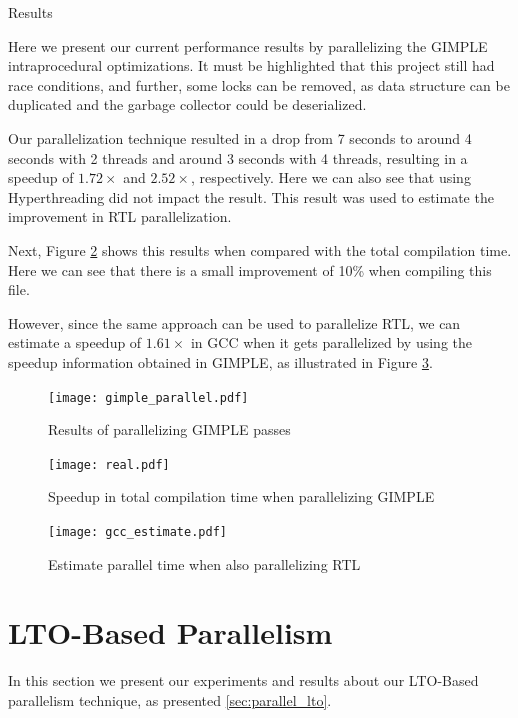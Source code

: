 \begin{subsection}{Results}\label{sec:threaded-results}

Here we present our current performance results by parallelizing the GIMPLE
intraprocedural optimizations. It must be highlighted that this project still had
race conditions, and further, some locks can be
removed, as data structure can be duplicated and the garbage collector could be
deserialized.

Our parallelization technique resulted in a drop from 7 seconds to around 4
seconds with 2 threads and around 3 seconds with 4 threads, resulting in a
speedup of $1.72\times$ and $2.52\times$, respectively. Here we can also see
that using Hyperthreading did not impact the result. This result was used to
estimate the improvement in RTL parallelization.

Next, Figure \ref{fig:parallel_real} shows this results when compared with the
total compilation time. Here we can see that there is a small improvement of
10\% when compiling this file.

However, since the same approach can be used to parallelize RTL, we can
estimate a speedup of $1.61\times$ in GCC when it gets parallelized by using
the speedup information obtained in GIMPLE, as illustrated in Figure
\ref{fig:parallel_estimate}.

\begin{figure}[H]
 \centering
 \texttt{[image: gimple\_parallel.pdf]}
 \caption{Results of parallelizing GIMPLE passes}
 \label{fig:parallel_gimple}
\end{figure}

\begin{figure}[H]
 \centering
 \texttt{[image: real.pdf]}
 \caption{Speedup in total compilation time when parallelizing GIMPLE}
 \label{fig:parallel_real}
\end{figure}

\begin{figure}[H]
 \centering
 \texttt{[image: gcc\_estimate.pdf]}
 \caption{Estimate parallel time when also parallelizing RTL}
 \label{fig:parallel_estimate}
\end{figure}

\end{subsection}

\section{LTO-Based Parallelism}

In this section we present our experiments and results about our
LTO-Based parallelism technique, as presented \ref{sec:parallel_lto}.

